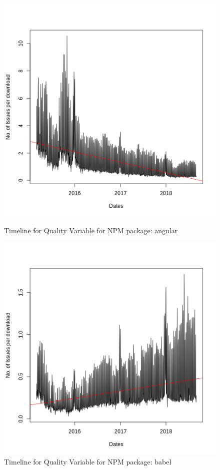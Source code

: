 \documentclass[smallextended]{svjour3}       %
\begin{document}
\begin{figure}[!t]
\begin{minipage}{.45\textwidth}
\centering
\includegraphics[width=\linewidth]{angular}
\caption{Timeline for Quality Variable for NPM package: angular}
\label{fig:tNa}
\end{minipage}
\hfill
\begin{minipage}{.45\textwidth}
\centering
\includegraphics[width=\linewidth]{babel}
\caption{Timeline for Quality Variable for NPM package: babel}
\label{fig:tNb}
\end{minipage}
\vspace{-10pt}
\end{figure}
\end{document}
